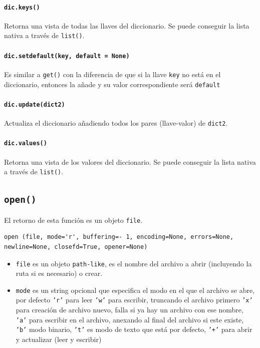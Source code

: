 \paragraph{\texttt{dic.keys()}} Retorna una vista de todas las llaves del diccionario. Se puede conseguir la lista nativa a través de \texttt{list()}.

\paragraph{\texttt{dic.setdefault(key, default = None)}} Es similar a \texttt{get()} con la diferencia de que si la llave \texttt{key} no está en el diccionario, entonces la añade y su valor correspondiente será \texttt{default}

\paragraph{\texttt{dic.update(dict2)}} Actualiza el diccionario añadiendo todos los pares (llave-valor) de \texttt{dict2}.

\paragraph{\texttt{dic.values()}} Retorna una vista de los valores del diccionario. Se puede conseguir la lista nativa a través de \texttt{list()}.

\subsection{\texttt{open()}}

El retorno de esta función es un objeto \texttt{file}.

\begin{verbatim}
open (file, mode='r', buffering=- 1, encoding=None, errors=None, newline=None, closefd=True, opener=None)
\end{verbatim}

\begin{itemize}
    \item \texttt{file} es un objeto \texttt{path-like}, es el nombre del archivo a abrir (incluyendo la ruta si es necesario) o crear.
    \item \texttt{mode} es un string opcional que especifica el modo en el que el archivo se abre, por defecto \texttt{'r'} para leer \texttt{'w'} para escribir, truncando el archivo primero \texttt{'x'} para creación de archivo nuevo, falla si ya hay un archivo con ese nombre, \texttt{'a'} para escribir en el archivo, anexando al final del archivo si este existe, \texttt{'b'} modo binario, \texttt{'t'} es modo de texto que está por defecto, \texttt{'+'} para abrir y actualizar (leer y escribir) 
\end{itemize}

